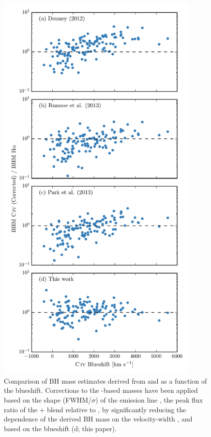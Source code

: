 \begin{figure}
    \includegraphics[width=0.9\textwidth]{figures/chapter03/corrections.pdf}  
    \caption{Comparison of BH mass estimates derived from  and \ha as a function of the  blueshift. Corrections to the -based masses have been applied based on the shape (FWHM/$\sigma$) of the  emission line \citep[a;][]{denney12}, the peak flux ratio of the + blend relative to  \citep[b;][]{runnoe13}, by significantly reducing the dependence of the derived BH mass on the  velocity-width \citep[c;][]{park13}, and based on the  blueshift (d; this paper).}
    \label{fig:compare_corrections}
\end{figure}

